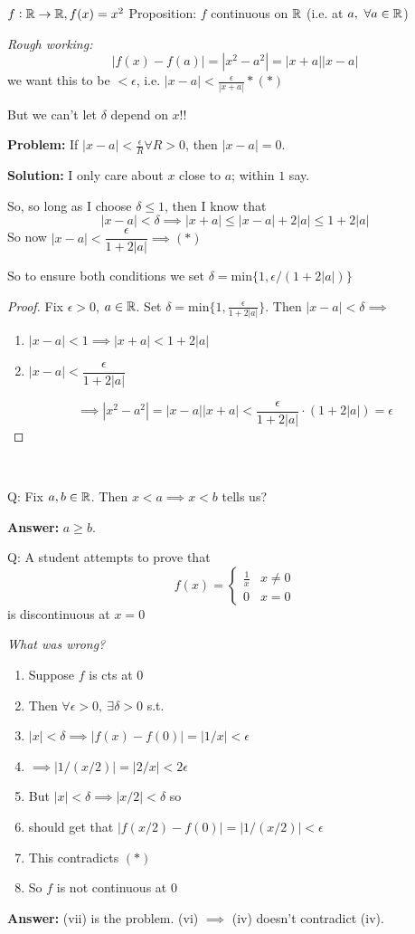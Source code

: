 \documentclass[10pt,twoside]{scrartcl}
\begin{document}
\begin{example}
$f: \mathbb{R}\to \mathbb{R}, f(x) = x^2$
Proposition: $f$ continuous on $\mathbb{R}$ (i.e. at $a,~\forall a \in\mathbb{R}$)

\emph{Rough working:} 
\[|f(x) - f(a)| = |x^2-a^2| = |x+a||x-a|\]
we want this to be $< \epsilon$, i.e. $|x-a| < \frac{\epsilon}{|x+a|} *(*)$

But we can't let $\delta$ depend on $x$!!

\textbf{Problem:} If $|x-a| < \frac{\epsilon}{R} \forall R>0$, then $|x-a| =0$.

\textbf{Solution:} I only care about $x$ close to $a$; within $1$ say.


So, so long as I choose $\delta \leq 1$, then I know that 
\[|x-a| < \delta \implies |x+a| \leq |x-a| + 2|a| \leq 1 + 2|a|\]
So now $|x-a| < \dfrac{\epsilon}{1 + 2|a|} \implies (*)$

So to ensure both conditions we set $\delta = \mathrm{min}\{1,\epsilon/(1+2|a|)\}$

\begin{proof}
Fix $\epsilon >0$, $a \in\mathbb{R}$. Set $\delta = \mathrm{min}\{1,\frac{\epsilon}{1 + 2|a|}\}$. Then $|x-a| < \delta \implies$
\begin{enumerate}
\item $|x-a| < 1 \implies |x+a| < 1 + 2|a|$
\item $|x-a| < \dfrac{\epsilon}{1 + 2|a|}$
\end{enumerate}

\[\implies |x^2 -a^2| = |x-a||x+a| < \dfrac{\epsilon}{1+2|a|}\cdot(1+2|a|) = \epsilon\]
\end{proof}
\end{example}~

\begin{clicker}
Q: Fix $a,b \in\mathbb{R}$. Then $x < a \implies x < b$ tells us? 

\textbf{Answer:} $a \geq b$. 

Q: A student attempts to prove that \[f(x) = \begin{cases}
 	\frac{1}{x} & x \neq 0\\
 	0 & x = 0
 \end{cases}\]
 is discontinuous at $x = 0$

\emph{What was wrong?}
\begin{enumerate}
\item Suppose $f$ is cts at $0$
\item Then $\forall \epsilon >0,~\exists \delta > 0$ s.t.
\item $|x| < \delta \implies |f(x) - f(0)| = |1/x| < \epsilon$
\item $\implies |1/(x/2)| = |2/x| < 2\epsilon$
\item But $|x| < \delta \implies |x/2| < \delta$ so
\item should get that $|f(x/2) - f(0)| = |1/(x/2)| < \epsilon$
\item This contradicts $(*)$	
\item So $f$ is not continuous at $0$
\end{enumerate}

\textbf{Answer:} (vii) is the problem. (vi) $\implies$ (iv) doesn't contradict (iv).
\end{clicker}
\end{document}
